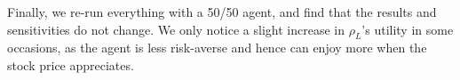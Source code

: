 Finally, we re-run everything with a 50/50 agent, and find that the results and sensitivities do not change. We only notice a slight increase in $\rho_L$'s utility in some occasions, as the agent is less risk-averse and hence can enjoy more when the stock price appreciates. 

